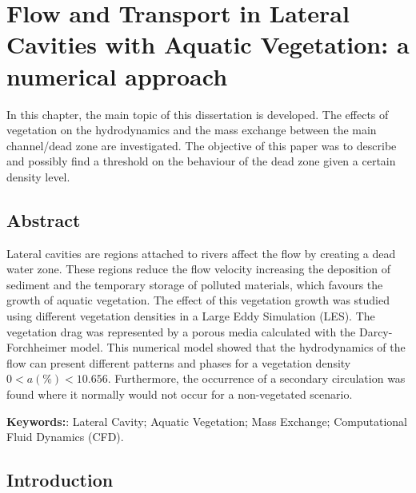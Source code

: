 \chapter{Flow and Transport in Lateral Cavities with Aquatic Vegetation: a numerical approach}
\label{chap:art4}
In this chapter, the main topic of this dissertation is developed. The effects of vegetation on the hydrodynamics and the mass exchange between the main channel/dead zone are investigated. The objective of this paper was to describe and possibly find a threshold on the behaviour of the dead zone given a certain density level.

\section*{Abstract}
Lateral cavities are regions attached to rivers affect the flow by creating a dead water zone. These regions reduce the flow velocity increasing the deposition of sediment and the temporary storage of polluted materials, which favours the growth of aquatic vegetation. The effect of this vegetation growth was studied using different vegetation densities in a Large Eddy Simulation (LES). The vegetation drag was represented by a porous media calculated with the Darcy-Forchheimer model. This numerical model showed that the hydrodynamics of the flow can present different patterns and phases for a vegetation density $0<a(\%)<10.656$. Furthermore, the occurrence of a secondary circulation was found where it normally would not occur for a non-vegetated scenario.

\noindent\textbf{Keywords:}: Lateral Cavity; Aquatic Vegetation; Mass Exchange; Computational Fluid Dynamics (CFD).

\section{Introduction}

\printbibliography[segment=\therefsegment,heading=subbibliography, title={References}]